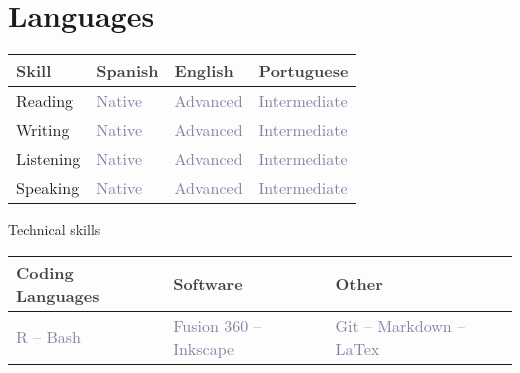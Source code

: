 \documentclass[11pt,a4paper,]{awesome-cv}
\begin{document}
\smallskip

\hypertarget{languages}{%
\section{\texorpdfstring{
Languages}{ Languages}}\label{languages}}

\begin{table}[H]
\centering\begingroup\fontsize{10}{12}\selectfont

\begin{tabular}{>{\centering\arraybackslash}p{4.5cm}>{\centering\arraybackslash}p{4.5cm}>{\centering\arraybackslash}p{4.5cm}>{\centering\arraybackslash}p{4.5cm}}
\toprule
\textcolor[HTML]{414141}{\textbf{Skill}} & \textcolor[HTML]{414141}{\textbf{Spanish}} & \textcolor[HTML]{414141}{\textbf{English}} & \textcolor[HTML]{414141}{\textbf{Portuguese}}\\
\midrule
Reading & \textcolor[HTML]{7f7f9f}{Native} & \textcolor[HTML]{7f7f9f}{Advanced} & \textcolor[HTML]{7f7f9f}{Intermediate}\\
Writing & \textcolor[HTML]{7f7f9f}{Native} & \textcolor[HTML]{7f7f9f}{Advanced} & \textcolor[HTML]{7f7f9f}{Intermediate}\\
Listening & \textcolor[HTML]{7f7f9f}{Native} & \textcolor[HTML]{7f7f9f}{Advanced} & \textcolor[HTML]{7f7f9f}{Intermediate}\\
Speaking & \textcolor[HTML]{7f7f9f}{Native} & \textcolor[HTML]{7f7f9f}{Advanced} & \textcolor[HTML]{7f7f9f}{Intermediate}\\
\bottomrule
\end{tabular}
\endgroup{}
\end{table}

 Technical skills

\begin{table}[H]
\centering\begingroup\fontsize{10}{12}\selectfont

\begin{tabular}{>{\centering\arraybackslash}p{4.75cm}>{\centering\arraybackslash}p{4.75cm}>{\centering\arraybackslash}p{4.75cm}}
\toprule
\textcolor[HTML]{414141}{\textbf{Coding Languages}} & \textcolor[HTML]{414141}{\textbf{Software}} & \textcolor[HTML]{414141}{\textbf{Other}}\\
\midrule
\textcolor[HTML]{7f7f9f}{R -- Bash} & \textcolor[HTML]{7f7f9f}{Fusion 360 -- Inkscape} & \textcolor[HTML]{7f7f9f}{Git -- Markdown -- LaTex}\\
\bottomrule
\end{tabular}
\endgroup{}
\end{table}


\label{LastPage}~
\end{document}
